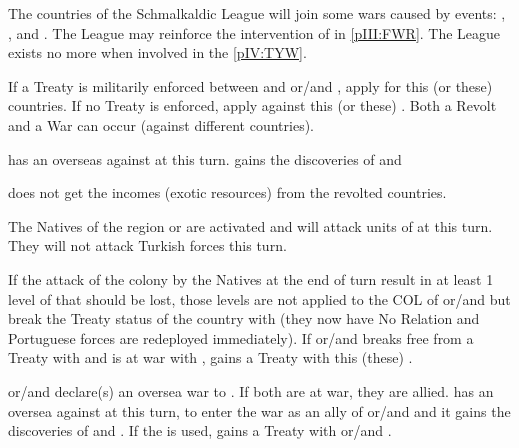 \effetlong
\aparag The countries of the Schmalkaldic League will join some wars caused by
events: , , and . The League may reinforce the intervention of \paysPalatinat in
\ref{pIII:FWR}. The League exists no more when involved in the \ref{pIV:TYW}.





\condition{}
\aparag If a Treaty is militarily enforced between \POR and \paysOman or/and
\paysAden, apply  for this (or these)
countries.
\aparag If no Treaty is enforced, apply 
against this (or these) \MIN. Both a Revolt and a War can occur (against
different countries).



\phdipl
\aparag \TUR has an overseas \CB against \POR at this turn. \TUR gains the
discoveries of  and 

\phadm
\POR does not get the incomes (exotic resources) from the revolted countries.

\phmil
\aparag The Natives of the region \granderegionOman or \granderegionAden are
activated and will attack units of \POR at this turn. They will not attack
Turkish forces this turn.

\phinter
\aparag If the attack of the colony by the Natives at the end of turn result
in at least 1 level of \COL that should be lost, those levels are not applied
to the COL of \paysOman or/and \paysAden but break the Treaty status of the
country with \POR (they now have No Relation and Portuguese forces are
redeployed immediately).
\aparag If \paysOman or/and \paysAden breaks free from a Treaty with \POR and
\TUR is at war with \POR, \TUR gains a Treaty with this (these) \MIN.



\phevnt
\aparag \paysOman or/and \paysAden declare(s) an oversea war to \POR. If both
are at war, they are allied.
\aparag \TUR has an oversea \CB against \POR at this turn, to enter the war as
an ally of \paysOman or/and \paysAden and it gains the discoveries of
 and .  If the \CB is used, \TUR gains a
Treaty with \paysOman or/and \paysAden.

